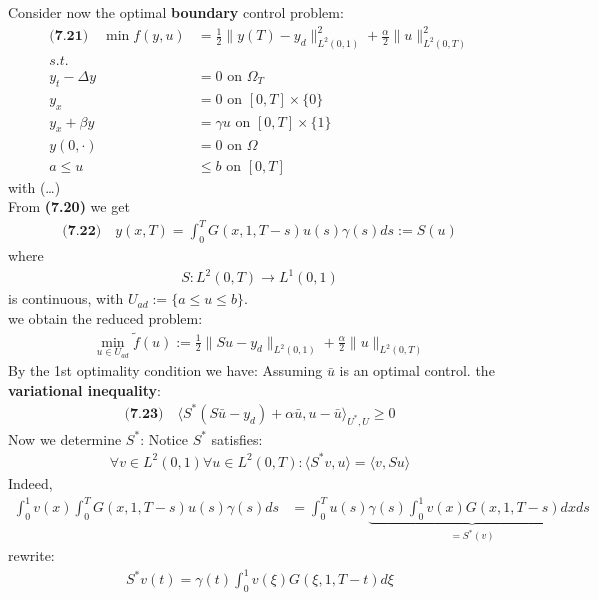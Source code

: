 \documentclass[a4paper,11pt,fleqn]{book}
\theoremstyle{definition}
\theoremstyle{remark}
\begin{document}
Consider now the optimal \textbf{boundary} control problem:
\begin{align*}
	\textbf{(7.21)} \quad
	\min f(y, u) &= \frac{1}{2}\|y(T) - y_d\|_{L^2(0, 1)}^2 + \frac{\alpha}{2}\|u\|_{L^2(0, T)}^2\\
	s.t.\\
	y_t - \Delta y &= 0 \text{ on } \Omega_T\\
	y_x &= 0 \text{ on } [0, T] \times \{0 \}\\
	y_x + \beta y &= \gamma u \text{ on } [0, T] \times \{1\}\\
	y(0, \cdot) &= 0 \text{ on } \Omega	\\
	a \le u &\le b \text{ on } [0, T]
\end{align*}
with (\dots)\\
From \textbf{(7.20)} we get
\begin{align*}
	\textbf{(7.22)}\quad
	y(x, T)= \int_0^T G(x, 1, T-s) u(s) \gamma(s) ds := S(u)
\end{align*}
where
\begin{align*}
	S: L^2(0, T) \rightarrow L^1(0, 1)
\end{align*}
is continuous, with $U_{ad}:= \{ a \le u \le b\}$.  \\
we obtain the reduced problem:
\begin{align*}
	\min_{u \in U_{ad}} \tilde{f}(u):= \frac{1}{2}\|Su - y_d\|_{L^2(0, 1)} + \frac{\alpha}{2}\|u\|_{L^2(0, T)}
\end{align*}
By the 1st optimality condition we have: Assuming $\bar{u}$ is an optimal control. the \textbf{variational inequality}:
\begin{align*}
	\textbf{(7.23)}\quad
	\langle S^*(S\bar{u} - y_d) + \alpha \bar{u}, u - \bar{u} \rangle_{U^*, U}  \ge 0
\end{align*}
Now we determine $S^*$: Notice $S^*$ satisfies:
\begin{align*}
	\forall v \in L^2(0, 1) \forall u \in L^2(0, T): \langle S^* v , u\rangle = \langle v, Su \rangle 
\end{align*}
Indeed,
\begin{align*}
	\int_0^1 v(x) \int_0^T G(x, 1, T - s)u(s) \gamma(s) ds &= 
	\int_0^T u(s) \underbrace{\gamma(s) \int_0^1 v(x) G(x, 1, T - s) dx}_{ = S^*(v)} ds
\end{align*}
rewrite:
\begin{align*}
	S^*v(t) = \gamma(t) \int_0^1 v(\xi) G(\xi, 1, T - t)d\xi
\end{align*}
\end{document}
